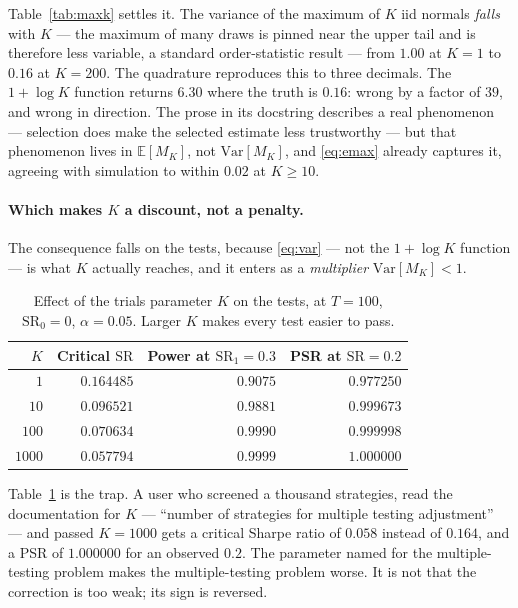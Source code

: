 \documentclass[11pt,a4paper]{article}
\newcommand{\SR}{\mathrm{SR}}
\begin{document}
Table~\ref{tab:maxk} settles it. The variance of the maximum of $K$ iid
normals \emph{falls} with $K$ --- the maximum of many draws is pinned near the
upper tail and is therefore less variable, a standard order-statistic result
\citep{david2003} --- from $1.00$ at $K = 1$ to $0.16$ at $K = 200$. The
quadrature reproduces this to three decimals. The $1 + \log K$ function
returns $6.30$ where the truth is $0.16$: wrong by a factor of $39$, and
wrong in direction. The prose in its docstring describes a real phenomenon ---
selection does make the selected estimate less trustworthy --- but that
phenomenon lives in $\mathbb{E}[M_K]$, not $\mathrm{Var}[M_K]$, and
\eqref{eq:emax} already captures it, agreeing with simulation to within
$0.02$ at $K \geq 10$.

\paragraph{Which makes $K$ a discount, not a penalty.}
The consequence falls on the tests, because \eqref{eq:var} --- not the
$1+\log K$ function --- is what $K$ actually reaches, and it enters as a
\emph{multiplier} $\mathrm{Var}[M_K] < 1$.

\begin{table}[t]
\centering
\caption{Effect of the trials parameter $K$ on the tests, at $T = 100$,
$\SR_0 = 0$, $\alpha = 0.05$. Larger $K$ makes every test easier to pass.}
\label{tab:kdirection}
\begin{tabular}{rrrr}
\toprule
$K$ & Critical $\SR$ & Power at $\SR_1 = 0.3$ & PSR at $\SR = 0.2$ \\
\midrule
$1$    & $0.164485$ & $0.9075$ & $0.977250$ \\
$10$   & $0.096521$ & $0.9881$ & $0.999673$ \\
$100$  & $0.070634$ & $0.9990$ & $0.999998$ \\
$1000$ & $0.057794$ & $0.9999$ & $1.000000$ \\
\bottomrule
\end{tabular}
\end{table}

Table~\ref{tab:kdirection} is the trap. A user who screened a thousand
strategies, read the documentation for $K$ --- ``number of strategies for
multiple testing adjustment'' --- and passed $K = 1000$ gets a critical Sharpe
ratio of $0.058$ instead of $0.164$, and a PSR of $1.000000$ for an observed
$0.2$. The parameter named for the multiple-testing problem makes the
multiple-testing problem worse. It is not that the correction is too weak; its
sign is reversed.
\end{document}
